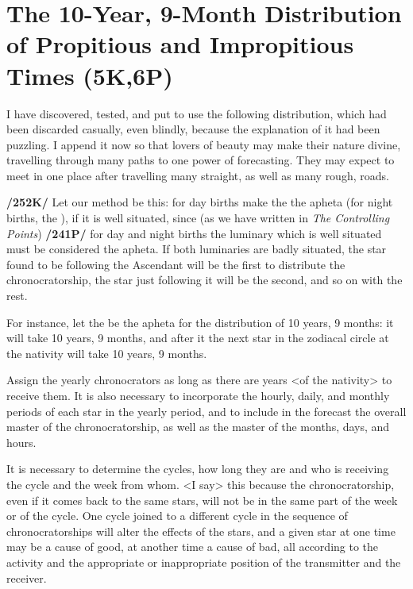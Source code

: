 \section{The 10-Year, 9-Month Distribution of Propitious and Impropitious Times (5K,6P)}

I have discovered, tested, and put to use the following distribution, which had been discarded casually, even blindly, because the explanation of it had been puzzling. I append it now so that lovers of beauty may make their nature divine, travelling through many paths to one power of forecasting. They may expect to meet in one place after travelling many straight, as well as many rough, roads.

\textbf{/252K/} Let our method be this: for day births make the \Sun\xspace the apheta (for night births, the \Moon), if it is well situated, since (as we have written in \textit{The Controlling Points}) \textbf{/241P/} for day and night births the luminary which is well situated must be considered the apheta. If both luminaries are badly situated, the star found to be following the Ascendant will be the first to distribute the chronocratorship, the star just following it will be the second, and so on with the rest.

For instance, let the \Sun\xspace be the apheta for the distribution of 10 years, 9 months: it will take 10 years, 9 months, and after it the next star in the zodiacal circle at the nativity will take 10 years, 9 months.

Assign the yearly chronocrators as long as there are years <of the nativity> to receive them. It is also necessary to incorporate the hourly, daily, and monthly periods of each star in the yearly period, and to include in the forecast the overall master of the chronocratorship, as well as the master of the months, days, and hours. 

It is necessary to determine the cycles, how long they are and who is receiving the cycle and the week from whom. <I say> this because the chronocratorship, even if it comes back to the same stars,
will not be in the same part of the week or of the cycle. One cycle joined to a different cycle in the sequence of chronocratorships will alter the effects of the stars, and a given star at one time may be a cause of good, at another time a cause of bad, all according to the activity and the appropriate or inappropriate position of the transmitter and the receiver.

